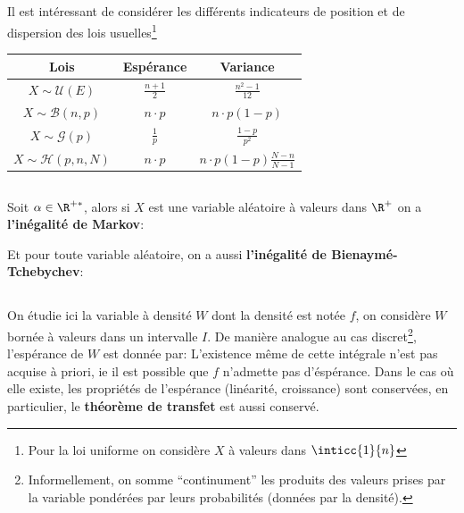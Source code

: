 \subsection*{}
Il est intéressant de considérer les différents indicateurs de position et de dispersion des lois usuelles\footnote[1]{Pour la loi uniforme on considère \(X\) à valeurs dans \(\inticc{1}{n}\)}

\begin{center}
   \renewcommand{\arraystretch}{2}
   \setlength{\tabcolsep}{18pt}
   
   \begin{tabular}{|c||c|c|}
      \hline
      Lois & \cellcolor{BrightBlue1!40} Espérance & \cellcolor{BrightBlue1!40} Variance \\ 
      \hline
      \cellcolor{BrightBlue1!40} \(X \sim \mathcal{U}(E)\) & \(\frac{n+1}{2}\) & \(\frac{n^2 - 1}{12}\) \\ 
      \hline
      \cellcolor{BrightBlue1!40} \(X \sim \mathcal{B}(n, p)\) & \(n\cdot p\) &  \(n\cdot p(1-p)\) \\ 
      \hline
      \cellcolor{BrightBlue1!40} \(X \sim \mathcal{G}(p)\) & \(\frac{1}{p}\) & \(\frac{1-p}{p^2}\) \\ 
      \hline
      \cellcolor{BrightBlue1!40} \(X \sim \mathcal{H}(p, n, N)\) & \(n\cdot p\) & \(n\cdot p(1-p)\frac{N - n}{N - 1}\) \\ 
      \hline
   \end{tabular}
\end{center}

\subsection*{}
Soit \(\alpha \in \R^{+*}\), alors si \(X\) est une variable aléatoire à valeurs dans \(\R^+\) on a \textbf{l'inégalité de Markov}:

Et pour toute variable aléatoire, on a aussi \textbf{l'inégalité de Bienaymé-Tchebychev}:


\subsection*{}
On étudie ici la variable à densité \(W\) dont la densité est notée \(f\), on considère \(W\) bornée à valeurs dans un intervalle \(I\).\+
De manière analogue au cas discret\footnote[2]{Informellement, on somme ``continument'' les produits des valeurs prises par la variable pondérées par leurs probabilités (données par la densité).}, l'espérance de \(W\) est donnée par:
L'existence même de cette intégrale n'est pas acquise à priori, ie il est possible que \(f\) n'admette pas d'éspérance.
Dans le cas où elle existe, les propriétés de l'espérance (linéarité, croissance) sont conservées, en particulier, le \textbf{théorème de transfet} est aussi conservé.\<

